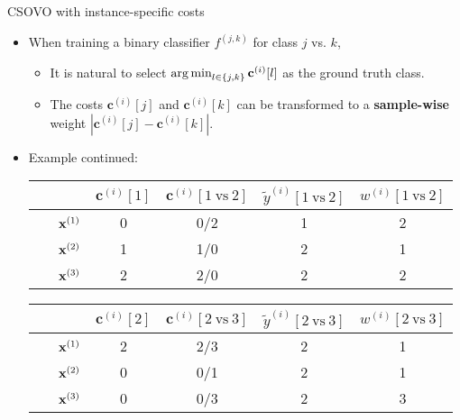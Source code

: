 \documentclass[11pt,compress,t,notes=noshow, xcolor=table]{beamer}
\newcommand{\cv}{\mathbf{c}}    %
\begin{document}
\begin{vbframe}{CSOVO with instance-specific costs \href{https://proceedings.mlr.press/v39/lin14.pdf}{}}
    \footnotesize
    \begin{itemize}
        \item When training a binary classifier $f^{(j, k)}$ for class $j$ vs. $k$,
        \begin{itemize}
            \footnotesize
            \item It is natural to select $\argmin_{l \in \{j, k\}} \cv^{(i)}[l]$ as the ground truth class.
            \vspace{5pt}
            
            \item The costs $\cv^{(i)}[j]$ and $\cv^{(i)}[k]$ can be transformed to a \textbf{sample-wise} weight $|\cv^{(i)}[j] - \cv^{(i)}[k]|$.
            \vspace{5pt}

            \vspace{5pt}
        \end{itemize}
        
        \item Example continued:
\begin{center}
    
                            \begin{tabular}{cc|cccc}\
        			& & $\cv^{(i)}[1]$ & $\cv^{(i)}[1 \ \text{vs} \ 2]$ & $\tilde{y}^{( i)}[1 \ \text{vs} \ 2]$ & $w^{(i)}[1 \ \text{vs} \ 2]$\\
        			\hline & $\mathbf{x}^{(1)}$ & 0 & 0/2 & 1 & 2\\
        			& $\mathbf{x}^{(2)}$ & 1 & 1/0 & 2 & 1 \\
                 	& $\mathbf{x}^{(3)}$ & 2 & 2/0 & 2 & 2\\
                \end{tabular}

            \vspace{5pt}
                            \begin{tabular}{cc|cccc}\
        			& & $\cv^{(i)}[2]$ & $\cv^{(i)}[2 \ \text{vs} \ 3]$ & $\tilde{y}^{( i)}[2 \ \text{vs} \ 3]$ & $w^{(i)}[2 \ \text{vs} \ 3]$\\
        			\hline & $\mathbf{x}^{(1)}$ & 2 & 2/3 & 2 & 1\\
        			& $\mathbf{x}^{(2)}$ & 0 & 0/1 & 2 & 1\\
                 	& $\mathbf{x}^{(3)}$ & 0 & 0/3 & 2 & 3\\
                \end{tabular}
\end{center}

    \end{itemize}
\end{vbframe}
\end{document}

